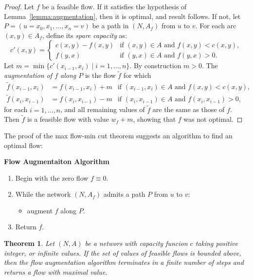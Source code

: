 \documentclass{amsbook}
\newtheorem{theorem}{Theorem}[section]
\theoremstyle{definition}
\theoremstyle{remark}
\begin{document}
\begin{proof}
  Let $f$ be a feasible flow.
  If it satisfies the hypothesis of Lemma~\ref{lemma:augmentation}, then it is optimal, and result follows.
  If not, let $P=(u=x_0,x_1,\dotsc,x_n=v)$ be a path in $(N,A_f)$ from $u$ to $v$.
  For each arc $(x,y)\in A_f$, define its \emph{spare capacity} as:
  \begin{displaymath}
    c'(x,y) =
    \begin{cases}
      c(x,y)-f(x,y) &\text{if } (x,y)\in A \text{ and } f(x,y)<c(x,y),\\
      f(y,x) &\text{if } (y,x)\in A \text{ and } f(y,x)>0.
    \end{cases}
  \end{displaymath}
  Let $m=\min\{c'(x_{i-1},x_i)\mid i=1,\dotsc,n\}$.
  By construction $m>0$.
  The \emph{augmentation of $f$ along $P$} is the flow $\tilde f$ for which
  \begin{align*}
    \tilde f(x_{i-1},x_i) & = f(x_{i-1},x_i) + m &\text{if $(x_{i-1},x_i)\in A$ and $f(x,y)<c(x,y)$},\\
    \tilde f(x_i,x_{i-1}) & = f(x_i,x_{i-1}) - m & \text{if $(x_i,x_{i-1})\in A$ and $f(x_i,x_{i-1})>0$},
  \end{align*}
  for each $i=1,\dotsc,n$, and all remaining values of $\tilde f$ are the same as those of $f$.
  Then $\tilde f$ is a feasible flow with value $w_f+m$, showing that $f$ was not optimal.
\end{proof}
The proof of the max flow-min cut theorem suggests an algorithm to find an optimal flow:
\begin{center}
  \textbf{Flow Augmentaiton Algorithm}
\end{center}
\begin{enumerate}
\item Begin with the zero flow $f\equiv 0$.
\item While the network $(N,A_f)$ admits a path $P$ from $u$ to $v$:
  \begin{itemize}
  \item   augment $f$ along $P$.
  \end{itemize}
\item Return $f$.
\end{enumerate}
\begin{theorem}
  Let $(N,A)$ be a networs with capacity funcion $c$ taking positive integer, or infinite values.
  If the set of values of feasible flows is bounded above, then the flow augmentation algorithm terminates in a finite number of steps and returns a flow with maximal value.
\end{theorem}
\end{document}
